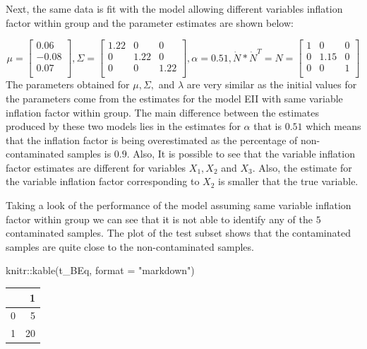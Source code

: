 \documentclass[
]{article}
\newenvironment{Shaded}{\begin{snugshade}}{\end{snugshade}}
\newcommand{\AttributeTok}[1]{\textcolor[rgb]{0.77,0.63,0.00}{#1}}
\newcommand{\FunctionTok}[1]{\textcolor[rgb]{0.00,0.00,0.00}{#1}}
\newcommand{\NormalTok}[1]{#1}
\newcommand{\SpecialCharTok}[1]{\textcolor[rgb]{0.00,0.00,0.00}{#1}}
\newcommand{\StringTok}[1]{\textcolor[rgb]{0.31,0.60,0.02}{#1}}
\begin{document}
Next, the same data is fit with the model allowing different variables
inflation factor within group and the parameter estimates are shown
below:

\[
\mu = \begin{bmatrix}0.06 \\-0.08 \\0.07 \\\end{bmatrix} , \Sigma = \begin{bmatrix}1.22&0&0 \\0&1.22&0 \\0&0&1.22 \\\end{bmatrix} , \alpha = 0.51, \dot{N} * \dot{N}^{T} = N = \begin{bmatrix}1&0&0 \\0&1.15&0 \\0&0&1 \\\end{bmatrix}
\] The parameters obtained for \(\mu,\Sigma,\) and \(\lambda\) are very
similar as the initial values for the parameters come from the estimates
for the model EII with same variable inflation factor within group. The
main difference between the estimates produced by these two models lies
in the estimates for \(\alpha\) that is \(0.51\) which means that the
inflation factor is being overestimated as the percentage of
non-contaminated samples is \(0.9\). Also, It is possible to see that
the variable inflation factor estimates are different for variables
\(X_{1},X_{2}\) and \(X_{3}\). Also, the estimate for the variable
inflation factor corresponding to \(X_{2}\) is smaller that the true
variable.

Taking a look of the performance of the model assuming same variable
inflation factor within group we can see that it is not able to identify
any of the \(5\) contaminated samples. The plot of the test subset shows
that the contaminated samples are quite close to the non-contaminated
samples.

\begin{Shaded}
\begin{Highlighting}[]
\NormalTok{knitr}\SpecialCharTok{::}\FunctionTok{kable}\NormalTok{(t\_BEq, }\AttributeTok{format =} \StringTok{"markdown"}\NormalTok{)}
\end{Highlighting}
\end{Shaded}

\begin{longtable}[]{@{}lr@{}}
\toprule()
& 1 \\
\midrule()
\endhead
0 & 5 \\
1 & 20 \\
\bottomrule()
\end{longtable}
\end{document}
